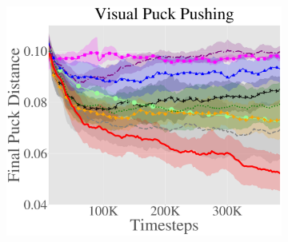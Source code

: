 \begin{figure}[ht!]
  \medskip

  \begin{subfigure}[t]{.49\linewidth}
    \centering
          \includegraphics[width=\linewidth]{skewfit/figures/plots/main_sawyer_fig_with_hazan/pusher.pdf}
  \end{subfigure}
  \hfill
  \begin{subfigure}[t]{.48\linewidth}
    \centering
\end{subfigure}
\end{figure}
